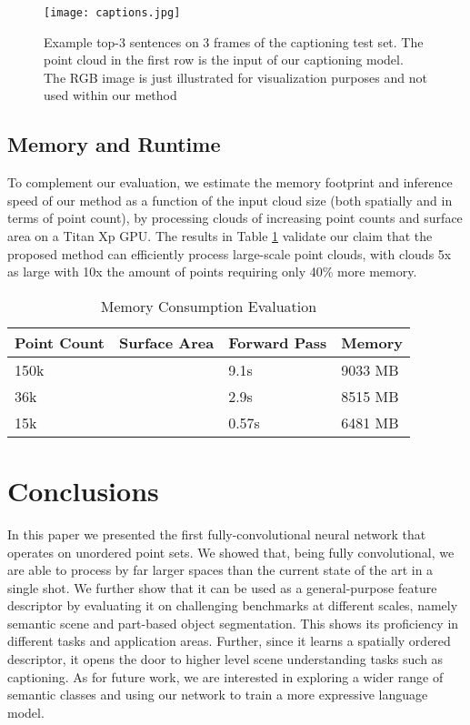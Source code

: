 \documentclass[runningheads]{llncs}
\begin{document}
\begin{figure}[t]
    \centering
 \texttt{[image: captions.jpg]} 
    \caption{Example top-3 sentences on 3 frames of the captioning test set. The point cloud in the first row is the input of our captioning model. The RGB image is just illustrated for visualization purposes and not used within our method}
    \label{fig:captiong_result} 
\end{figure}

\subsection{Memory and Runtime}

To complement our evaluation, we estimate the memory footprint and inference speed of our method as a function of the input cloud size (both spatially and in terms of point count), by processing clouds of increasing point counts and surface area on a Titan Xp GPU. The results in Table \ref{table:runtime} validate our claim that the proposed method can efficiently process large-scale point clouds, with clouds 5x as large with 10x the amount of points requiring only 40\% more memory.

\begin{table}[h]
\setlength{\tabcolsep}{1em}
\centering
\caption{Memory Consumption Evaluation}
\label{table:runtime}
{{\renewcommand{\arraystretch}{1.1}\begin{tabular}{l l l l}
\textbf{Point Count} & \textbf{Surface Area} & \textbf{Forward Pass} & \textbf{Memory} \\
\hline
150k &  & 9.1s & 9033 MB\\
36k &  & 2.9s & 8515 MB\\
15k &  & 0.57s & 6481 MB\\                 
\end{tabular}}}
\end{table}

\section{Conclusions}

In this paper we presented the first fully-convolutional neural network that operates on unordered point sets. We showed that, being fully convolutional, we are able to process by far larger spaces than the current state of the art in a single shot. We further show that it can be used as a general-purpose feature descriptor by evaluating it on challenging benchmarks at different scales, namely semantic scene and part-based object segmentation. This shows its proficiency in different tasks and application areas. Further, since it learns a spatially ordered descriptor, it opens the door to higher level scene understanding tasks such as captioning. As for future work, we are interested in exploring a wider range of semantic classes and using our network to train a more expressive language model.



\end{document}
